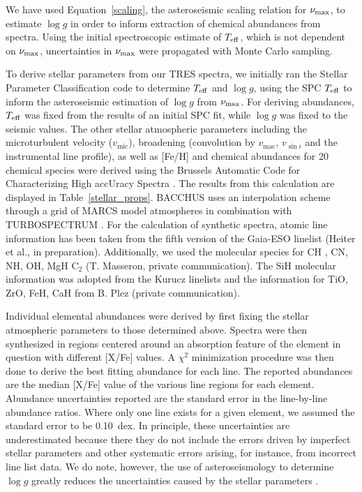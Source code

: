 \documentclass[a4paper,fleqn,usenatbib]{mnras}
\newcommand{\numax}{\mbox{$\nu_{\rm max}$}\xspace}
\newcommand{\teff}{\mbox{$T_{\rm eff}$}\xspace}
\newcommand{\logg}{\mbox{$\log g$}\xspace}
\begin{document}
We have used Equation~\ref{scaling}, the asteroseismic scaling relation for \numax \citep{1991ApJ...368..599B,KB95}, to estimate \logg in order to inform extraction of chemical abundances from spectra. Using the initial spectroscopic estimate of \teff, which is not dependent on \numax, uncertainties in \numax were propagated with Monte Carlo sampling. 

To derive stellar parameters from our TRES spectra, we initially ran the Stellar Parameter Classification code \citep[SPC:][]{spc} to determine \teff and \logg, using the SPC \teff to inform the asteroseismic estimation of \logg from \numax. For deriving abundances, \teff was fixed from the results of an initial SPC fit, while \logg was fixed to the seismic values. The other stellar atmospheric parameters including the microturbulent velocity ($v_{\text{mic}}$), broadening (convolution by $v_{\text{mac}}$, $v_{\sin{i}}$ and the instrumental line profile), as well as [Fe/H] and chemical abundances for 20 chemical species were derived using the Brussels Automatic Code for Characterizing High accUracy Spectra \citep[BACCHUS:][]{bacchus}. The results from this calculation are displayed in Table~\ref{stellar_props}. BACCHUS uses an interpolation scheme through a grid of MARCS model atmospheres \citep{Gustafsson2008} in combination with TURBOSPECTRUM \citep{Alvarez1998, Plez2012}. For the calculation of synthetic spectra, atomic line information has been taken from the fifth version of the Gaia-ESO linelist (Heiter et al., in preparation). Additionally, we used the molecular species for CH \citep{Masseron2014}, CN, NH, OH, MgH  C$_{2}$ (T. Masseron, private communication). The SiH molecular information was adopted from the Kurucz linelists and the information for TiO, ZrO, FeH, CaH from B. Plez (private communication). 

Individual elemental abundances were derived by first fixing the stellar atmospheric parameters to those determined above. Spectra were then synthesized in regions centered around an absorption feature of the element in question with different [X/Fe] values. A $\chi^2$ minimization procedure was then done to derive the best fitting abundance for each line. The reported abundances are the median [X/Fe] value of the various line regions for each element. Abundance uncertainties reported are the standard error in the line-by-line abundance ratios. Where only one line exists for a given element, we assumed the standard error to be 0.10~dex. In principle, these uncertainties are underestimated because there they do not include the errors driven by imperfect stellar parameters and other systematic errors arising, for instance, from incorrect line list data. We do note, however, the use of asteroseismology to determine \logg greatly reduces the uncertainties caused by the stellar parameters \citep[see][for a longer discussion on this]{hawkinsapogee}. 
\end{document}
